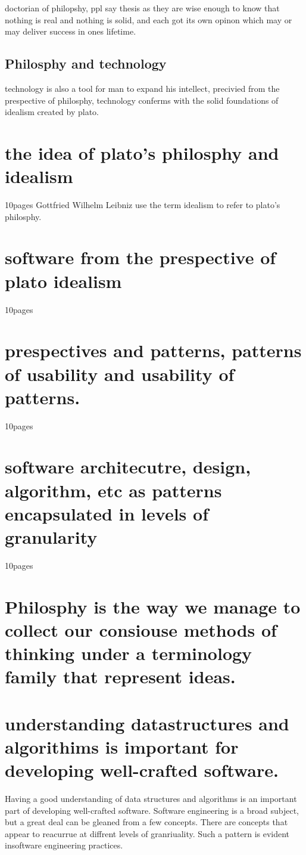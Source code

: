 doctorian of philopshy, ppl say thesis as they are wise enough to know that nothing is real and nothing is solid, and each got its own opinon which may or may deliver success in ones lifetime.

\subsection{Philosphy and technology}
technology is also a tool for man to expand his intellect, precivied from the prespective of philosphy, technology conferms with the solid foundations of idealism created by plato.



\section{the idea of plato's philosphy and idealism} 10pages
Gottfried Wilhelm Leibniz use the term idealism to refer to plato's philosphy.

\section{software from the prespective of plato idealism} 10pages

\section{prespectives and patterns, patterns of usability and usability of patterns.} 10pages

\section{software architecutre, design, algorithm, etc as patterns encapsulated in levels of granularity} 10pages

\section{Philosphy is the way we manage to collect our consiouse methods of thinking under a terminology family that represent ideas.}

\section{understanding datastructures and algorithims is important for developing well-crafted software.}

Having a good understanding of data structures and algorithms is an important part of developing well-crafted software. Software engineering is a broad subject, but a great deal can be gleaned from a few concepts. There are concepts that appear to reacurrue at diffrent levels of granriuality. Such a pattern is evident insoftware engineering practices.


